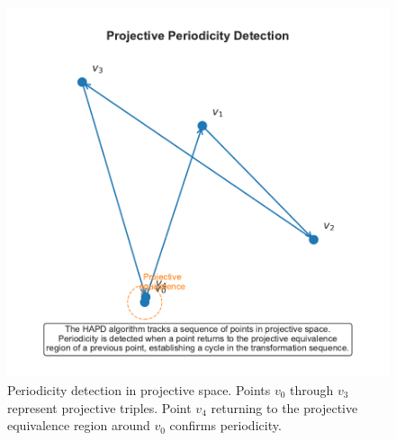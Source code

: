 \begin{figure}[htbp]
\begin{minipage}{\textwidth}
\centering
\includegraphics[width=\textwidth]{figures/output/projective_periodicity_visualization.pdf}
\caption{Periodicity detection in projective space. Points $v_0$ through $v_3$ represent projective triples. Point $v_4$ returning to the projective equivalence region around $v_0$ confirms periodicity.}
\label{fig:projective_visualization}
\end{minipage}
\end{figure}

